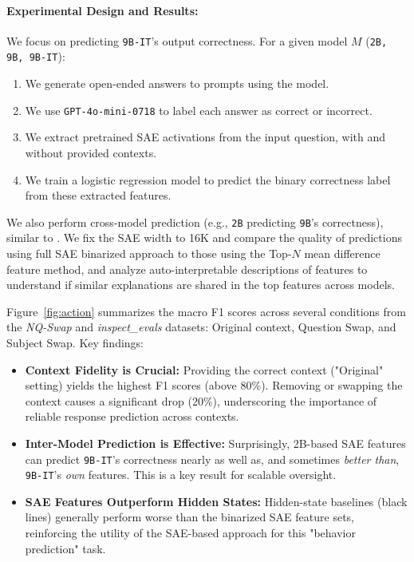 \paragraph{Experimental Design and Results:}
We focus on predicting \texttt{9B-IT}'s output correctness. For a given model $M$ (\texttt{2B, 9B, 9B-IT}):
\begin{enumerate}[itemsep=-1.7pt,topsep=1.5pt]
    \item We generate open-ended answers to prompts using the model.
    \item We use \texttt{GPT-4o-mini-0718} to label each answer as correct or incorrect.
    \item We extract pretrained SAE activations from the input question, with and without provided contexts.
    \item We train a logistic regression model to predict the binary correctness label from these extracted features.
\end{enumerate}


We also perform cross-model prediction (e.g., \texttt{2B} predicting \texttt{9B}'s correctness), similar to \cite{binder2024lookinginwardlanguagemodels}. We fix the SAE width to 16K and compare the quality of predictions using full SAE binarized approach to those using the Top-$N$ mean difference feature method, and analyze auto-interpretable descriptions of features to understand if similar explanations are shared in the top features across models.

Figure~\ref{fig:action} summarizes the macro F1 scores across several conditions from the \emph{NQ-Swap} and \emph{inspect\_evals} datasets: Original context, Question Swap, and Subject Swap. Key findings:

\begin{itemize}[itemsep=-1.7pt,topsep=1.5pt]
    \item \textbf{Context Fidelity is Crucial:} Providing the correct context ("Original" setting) yields the highest F1 scores (above 80\%). Removing or swapping the context causes a significant drop (20\%), underscoring the importance of reliable response prediction across contexts.
    \item \textbf{Inter-Model Prediction is Effective:} Surprisingly, 2B-based SAE features can predict \texttt{9B-IT}'s correctness nearly as well as, and sometimes \emph{better than}, \texttt{9B-IT}'s \emph{own} features. This is a key result for scalable oversight.
    \item \textbf{SAE Features Outperform Hidden States:} Hidden-state baselines (black lines) generally perform worse than the binarized SAE feature sets, reinforcing the utility of the SAE-based approach for this "behavior prediction" task.
\end{itemize}

